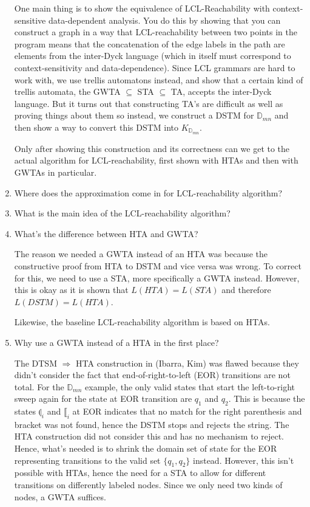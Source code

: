 \documentclass[12pt]{article}
\theoremstyle{remark}
\theoremstyle{remark}
\begin{document}
\begin{enumerate}
  One main thing is to show the equivalence of LCL-Reachability with context-sensitive data-dependent analysis. You do this by showing that you can construct a graph in a way that LCL-reachability between two points in the program means that the concatenation of the edge labels in the path are elements from the inter-Dyck language (which in itself must correspond to context-sensitivity and data-dependence). Since LCL grammars are hard to work with, we use trellis automatons instead, and show that a certain kind of trellis automata, the GWTA $\subseteq$ STA $\subseteq$ TA, accepts the inter-Dyck language. But it turns out that constructing TA's are difficult as well as proving things about them so instead, we construct a DSTM for $\mathbb{D}_{mn}$ and then show a way to convert this DSTM into $K_{\mathbb{D}_{mn}}$.

  Only after showing this construction and its correctness can we get to the actual algorithm for LCL-reachability, first shown with HTAs and then with GWTAs in particular.

  \item Where does the approximation come in for LCL-reachability algorithm?
  \item What is the main idea of the LCL-reachability algorithm?
  \item What's the difference between HTA and GWTA?
  
  The reason we needed a GWTA instead of an HTA was because the constructive proof from HTA to DSTM and vice versa was wrong. To correct for this, we need to use a STA, more specifically a GWTA instead. However, this is okay as it is shown that $L(HTA) = L(STA)$ and therefore $L(DSTM) = L(HTA)$.

  Likewise, the baseline LCL-reachability algorithm is based on HTAs.

  \item Why use a GWTA instead of a HTA in the first place?
  
  The DTSM $\Rightarrow$ HTA construction in (Ibarra, Kim) was flawed because they didn't consider the fact that end-of-right-to-left (EOR) transitions are not total. For the $\mathbb{D}_{mn}$ example, the only valid states that start the left-to-right sweep again for the state at EOR transition are $q_1$ and $q_2$. This is because the states $\llparenthesis_i$ and $\llbracket_i$ at EOR indicates that no match for the right parenthesis and bracket was not found, hence the DSTM stops and rejects the string. The HTA construction did not consider this and has no mechanism to reject. Hence, what's needed is to shrink the domain set of state for the EOR representing transitions to the valid set $\{q_1, q_2\}$ instead. However, this isn't possible with HTAs, hence the need for a STA to allow for different transitions on differently labeled nodes. Since we only need two kinds of nodes, a GWTA suffices.


\end{enumerate}
\end{document}
